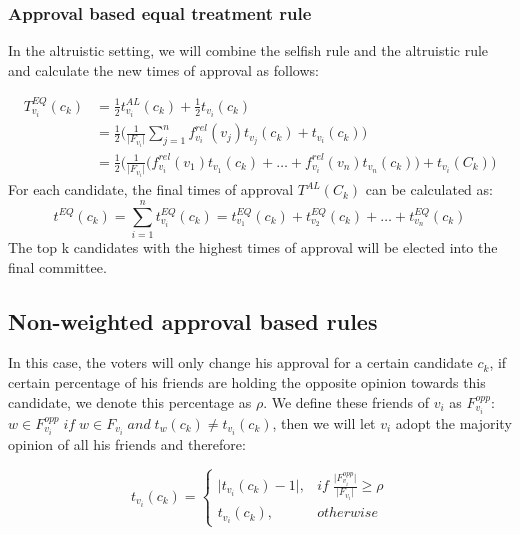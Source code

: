 \documentclass{article}
\begin{document}
\subsubsection{Approval based equal treatment rule}

In the altruistic setting, we will combine the selfish rule and the altruistic rule and calculate the new times of approval as follows:

\begin{equation}
   \begin{split}
T_{v_i}^{EQ}(c_k) &= \frac{1}{2}t_{v_i}^{AL}(c_k) +\frac{1}{2}t_{v_i}(c_k)\\
                  &= \frac{1}{2}\big(\frac{1}{\vert F_{v_i}\vert}\sum_{j=1}^{n}  f_{v_i}^{rel}(v_j)t_{v_j}(c_k)
                  +t_{v_i}(c_k)\big)\\
                  &= \frac{1}{2}\Big(\frac{1}{\vert F_{v_i}\vert}\big(f_{v_i}^{rel}(v_1)t_{v_1}(c_k) + \dots + f_{v_i}^{rel}(v_n)t_{v_n}(c_k)\big)+t_{v_i}(C_k)\Big)\label{AB:EQ_singlevoter_Times}
\end{split}
\end{equation}
For each candidate, the final times of approval $T^{AL}(C_k)$ can be calculated as:
\begin{equation}
t^{EQ}(c_k) = \sum_{i=1}^{n} t_{v_i}^{EQ}(c_k)= t_{v_1}^{EQ}(c_k) + t_{v_2}^{EQ}(c_k) + \dots + t_{v_n}^{EQ}(c_k)\label{AB:EQ_aggr_voter_Times}
\end{equation}
The top k candidates with the highest times of approval will be elected into the final committee.


\subsection{Non-weighted approval based rules}

In this case, the voters will only change his approval for a certain candidate $c_k$, if certain percentage of his friends are holding the opposite opinion towards this candidate, we denote this percentage as $\rho$. We define these friends of $v_i$ as $F^{opp}_{v_i}$: $w \in F^{opp}_{v_i} \; if \; w \in F_{v_i}\; and \;t_{w}(c_k) \neq t_{v_i}(c_k)$, then we will let $v_i$ adopt the majority opinion of all his friends and therefore:

\begin{equation} 
        t_{v_i}(c_k) =
        \begin{cases}
        \vert t_{v_i}(c_k) - 1 \vert, & if \; \frac{\vert F^{opp}_{v_i} \vert}{\vert F_{v_i} \vert}\geqslant \rho \\
        t_{v_i}(c_k), &otherwise
        \end{cases}\label{NW:voter_Times}
\end{equation}
\end{document}

